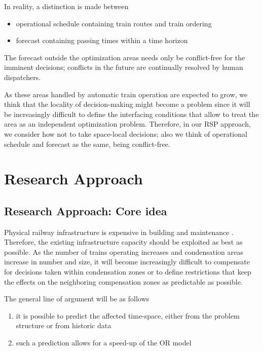 \documentclass{article}
\begin{document}
In reality, a distinction is made between
\begin{itemize}
    \item operational schedule containing train routes and train ordering
    \item forecast containing passing times within a time horizon
\end{itemize}
%
The forecast outside the optimization areas needs only be conflict-free for the imminent decisions; conflicts in the future are continually resolved by human dispatchers.

As these areas handled by automatic train operation are expected to grow, we think that the locality of decision-making might become a problem since it will be increasingly difficult to define the interfacing conditions that allow to treat the area as an independent optimization problem.
%
Therefore, in our RSP approach, we consider how not to take space-local decisions; also we think of operational schedule and forecast as the same, being conflict-free.


\section{Research Approach}\label{sec:researchapproach}

\subsection{Research Approach: Core idea}\label{subec:coreidea}

Physical railway infrastructure is expensive in building and maintenance \cite{sr40programm}. 
Therefore, the existing infrastructure capacity should be exploited as best as possible.
As the number of trains operating increases and condensation areas increase in number and size, it will become increasingly difficult to compensate for decisions taken within condensation zones or to define restrictions that keep the effects on the neighboring compensation zones as predictable as possible.


The general line of argument will be as follows
\begin{enumerate}
\item it is possible to predict the affected time-space, either from the problem structure or from historic data
\item such a prediction allows for a speed-up of the OR model
\end{enumerate}
\end{document}
